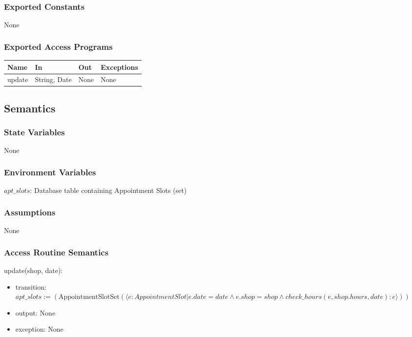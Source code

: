 \documentclass[12pt, titlepage]{article}
\begin{document}
\subsubsection{Exported Constants}
None

\subsubsection{Exported Access Programs}
\begin{center}
\begin{tabular}{p{2cm} p{4cm} p{4cm} p{2cm}}
\hline
\textbf{Name} & \textbf{In} & \textbf{Out} & \textbf{Exceptions} \\
\hline
update & String, Date & None & None \\
\hline
\end{tabular}
\end{center}

\subsection{Semantics}

\subsubsection{State Variables}
None

\subsubsection{Environment Variables}
$apt\_slots$: Database table containing Appointment Slots (set)

\subsubsection{Assumptions}
None

\subsubsection{Access Routine Semantics}
\noindent update(shop, date):
\begin{itemize}
\item transition: \\
$apt\_slots := (\text{AppointmentSlotSet}(\langle e: AppointmentSlot | e.date = date \land e.shop = shop \land check\_hours(e, shop.hours, date): e \rangle))$
\item output: None
\item exception: None
\end{itemize}
\end{document}

